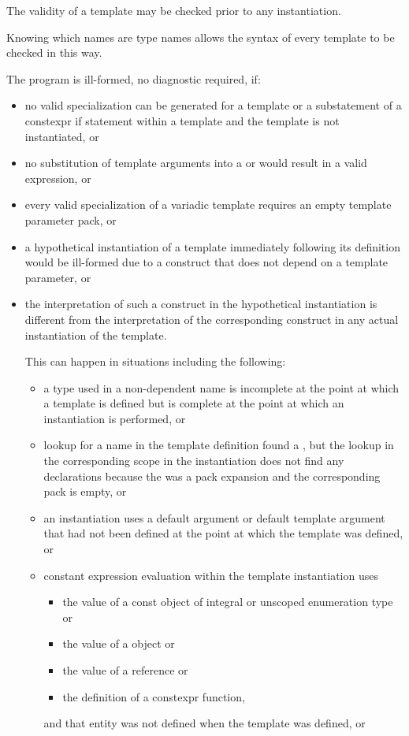 \pnum
{}%
%
The validity of a template may be checked prior to any instantiation.
\begin{note}
Knowing which names are type names allows the syntax of every template
to be checked in this way.
\end{note}
The program is ill-formed, no diagnostic required, if:

\begin{itemize}
\item
no valid specialization can be generated for a template
or a substatement of a constexpr if statement within a template
and the template is not instantiated, or
\item
no substitution of template arguments
into a  or 
would result in a valid expression, or
\item
every valid specialization of a variadic template requires an empty template
parameter pack, or
\item
a hypothetical instantiation of a template
immediately following its definition
would be ill-formed
due to a construct that does not depend on a template parameter, or
\item
the interpretation of such a construct
in the hypothetical instantiation
is different from
the interpretation of the corresponding construct
in any actual instantiation of the template.
\begin{note}
This can happen in situations including the following:
\begin{itemize}
\item a type used in a non-dependent name is incomplete at the point at which a
template is defined but is complete at the point at which an instantiation is
performed, or

\item lookup for a name in the template definition found a ,
but the lookup in the corresponding scope in the instantiation
does not find any declarations because the 
was a pack expansion and the corresponding pack is empty, or

\item an instantiation uses a default argument or default template argument
that had not been defined at the point at which the template was defined, or

\item constant expression evaluation within the template
instantiation uses
  \begin{itemize}
  \item the value of a const object of integral or unscoped enumeration type or
  \item the value of a  object or
  \item the value of a reference or
  \item the definition of a constexpr function,
  \end{itemize}
and that entity was not defined when the template was defined, or


\end{itemize}
\end{note}
\end{itemize}

